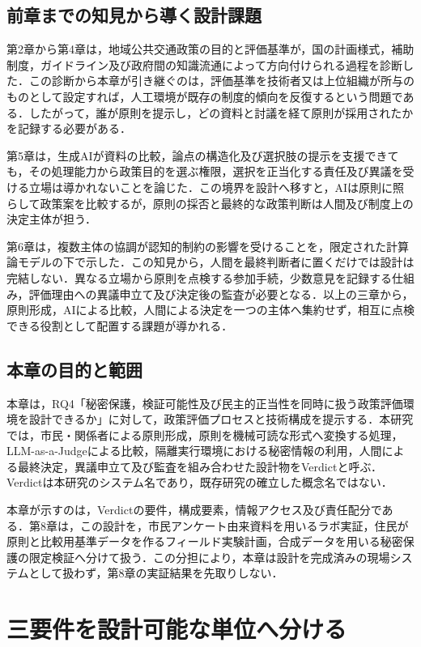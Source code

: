 \subsection{前章までの知見から導く設計課題}

第2章から第4章は，地域公共交通政策の目的と評価基準が，国の計画様式，補助制度，ガイドライン及び政府間の知識流通によって方向付けられる過程を診断した．この診断から本章が引き継ぐのは，評価基準を技術者又は上位組織が所与のものとして設定すれば，人工環境が既存の制度的傾向を反復するという問題である．したがって，誰が原則を提示し，どの資料と討議を経て原則が採用されたかを記録する必要がある．

第5章は，生成AIが資料の比較，論点の構造化及び選択肢の提示を支援できても，その処理能力から政策目的を選ぶ権限，選択を正当化する責任及び異議を受ける立場は導かれないことを論じた．この境界を設計へ移すと，AIは原則に照らして政策案を比較するが，原則の採否と最終的な政策判断は人間及び制度上の決定主体が担う．

第6章は，複数主体の協調が認知的制約の影響を受けることを，限定された計算論モデルの下で示した．この知見から，人間を最終判断者に置くだけでは設計は完結しない．異なる立場から原則を点検する参加手続，少数意見を記録する仕組み，評価理由への異議申立て及び決定後の監査が必要となる．以上の三章から，原則形成，AIによる比較，人間による決定を一つの主体へ集約せず，相互に点検できる役割として配置する課題が導かれる．

\subsection{本章の目的と範囲}

本章は，RQ4「秘密保護，検証可能性及び民主的正当性を同時に扱う政策評価環境を設計できるか」に対して，政策評価プロセスと技術構成を提示する．本研究では，市民・関係者による原則形成，原則を機械可読な形式へ変換する処理，LLM-as-a-Judgeによる比較，隔離実行環境における秘密情報の利用，人間による最終決定，異議申立て及び監査を組み合わせた設計物をVerdictと呼ぶ．Verdictは本研究のシステム名であり，既存研究の確立した概念名ではない．

本章が示すのは，Verdictの要件，構成要素，情報アクセス及び責任配分である．第8章は，この設計を，市民アンケート由来資料を用いるラボ実証，住民が原則と比較用基準データを作るフィールド実験計画，合成データを用いる秘密保護の限定検証へ分けて扱う．この分担により，本章は設計を完成済みの現場システムとして扱わず，第8章の実証結果を先取りしない．

\section{三要件を設計可能な単位へ分ける}

